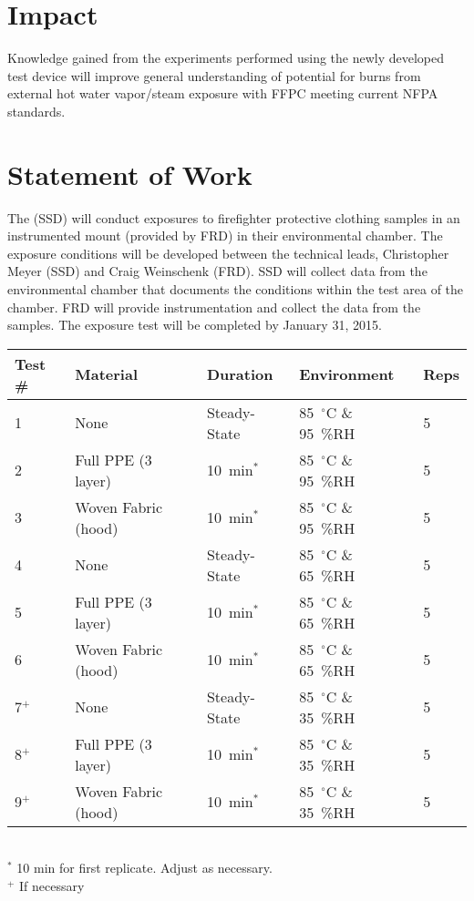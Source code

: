 \documentclass[12pt,letterpaper]{article}
\begin{document}
\section{Impact}

Knowledge gained from the experiments performed using the newly developed test device will improve general understanding of potential for burns from external hot water vapor/steam exposure with FFPC meeting current NFPA standards.  

\section{Statement of Work}

The (SSD) will conduct exposures to firefighter protective clothing samples in an instrumented mount (provided by FRD) in their environmental chamber.  The exposure conditions will be developed between the technical leads, Christopher Meyer (SSD) and Craig Weinschenk (FRD).   SSD will collect data from the environmental chamber that documents the conditions within the test area of the chamber.  FRD will provide instrumentation and collect the data from the samples.  The exposure test will be completed by January 31, 2015.  

\begin{table}
\centering
{}\label{tab:tests}
\begin{tabular}{lllll}
\toprule[1.5pt]
Test \#       &  Material                   &  Duration       &  Environment       &  Reps  \\
\midrule
1               &  None                       &  Steady-State   &  85~$^{\circ}$C \& 95~\%RH   &  5  \\[.25cm]
2               &  Full PPE (3 layer)         &  10~min$^*$     &  85~$^{\circ}$C \& 95~\%RH   &  5  \\[.25cm]
3               &  Woven Fabric (hood)        &  10~min$^*$     &  85~$^{\circ}$C \& 95~\%RH   &  5  \\[.25cm]
4               &  None                       &  Steady-State   &  85~$^{\circ}$C \& 65~\%RH    &  5 \\[.25cm]
5               &  Full PPE (3 layer)         &  10~min$^*$     &  85~$^{\circ}$C \& 65~\%RH    &  5  \\[.25cm]
6               &  Woven Fabric (hood)        &  10~min$^*$     &  85~$^{\circ}$C \& 65~\%RH    &  5 \\[.25cm]
7$^+$           &  None                       &  Steady-State   &  85~$^{\circ}$C \& 35~\%RH    &  5 \\[.25cm]
8$^+$           &  Full PPE (3 layer)         &  10~min$^*$     &  85~$^{\circ}$C \& 35~\%RH    &  5 \\[.25cm]
9$^+$           &  Woven Fabric (hood)        &  10~min$^*$     &  85~$^{\circ}$C \& 35~\%RH   &  5 \\[.25cm]
\bottomrule[1.25pt]
\end{tabular}
\footnotesize
\raggedright
\\ $^*$ 10 min for first replicate. Adjust as necessary.
\\ $^+$ If necessary
\normalsize
\end{table}
\end{document}
